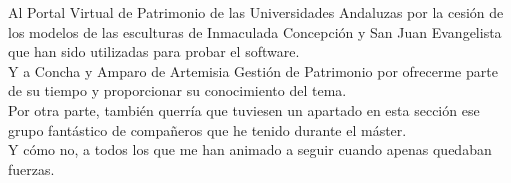 Al Portal Virtual de Patrimonio de las Universidades Andaluzas por la cesión de los modelos de las esculturas de Inmaculada Concepción y San Juan Evangelista que han sido utilizadas para probar el software. 
\\

Y a Concha y Amparo de Artemisia Gestión de Patrimonio por ofrecerme parte de su tiempo y proporcionar su conocimiento del tema.
\\

Por otra parte, también querría que tuviesen un apartado en esta sección ese grupo fantástico de compañeros que he tenido durante el máster. 
\\

Y cómo no, a todos los que me han animado a seguir cuando apenas quedaban fuerzas.